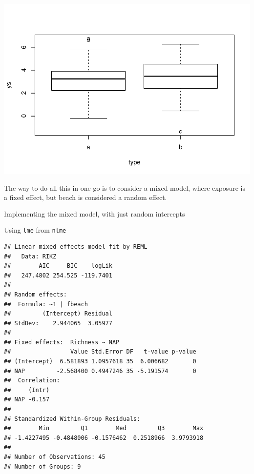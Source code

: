 \documentclass[
]{book}
\newenvironment{Shaded}{\begin{snugshade}}{\end{snugshade}}
\newcommand{\AttributeTok}[1]{\textcolor[rgb]{0.13,0.29,0.53}{#1}}
\newcommand{\DecValTok}[1]{\textcolor[rgb]{0.00,0.00,0.81}{#1}}
\newcommand{\FunctionTok}[1]{\textcolor[rgb]{0.13,0.29,0.53}{\textbf{#1}}}
\newcommand{\NormalTok}[1]{#1}
\newcommand{\OtherTok}[1]{\textcolor[rgb]{0.56,0.35,0.01}{#1}}
\newcommand{\SpecialCharTok}[1]{\textcolor[rgb]{0.81,0.36,0.00}{\textbf{#1}}}
\begin{document}
\includegraphics{ECOMODbook_files/figure-latex/unnamed-chunk-65-1.pdf}

The way to do all this in one go is to consider a mixed model, where exposure is a fixed effect, but beach is considered a random effect.

Implementing the mixed model, with just random intercepts

Using \texttt{lme} from \texttt{nlme}

\begin{Shaded}
\end{Shaded}

\begin{verbatim}
## Linear mixed-effects model fit by REML
##   Data: RIKZ 
##        AIC     BIC    logLik
##   247.4802 254.525 -119.7401
## 
## Random effects:
##  Formula: ~1 | fbeach
##         (Intercept) Residual
## StdDev:    2.944065  3.05977
## 
## Fixed effects:  Richness ~ NAP 
##                 Value Std.Error DF   t-value p-value
## (Intercept)  6.581893 1.0957618 35  6.006682       0
## NAP         -2.568400 0.4947246 35 -5.191574       0
##  Correlation: 
##     (Intr)
## NAP -0.157
## 
## Standardized Within-Group Residuals:
##        Min         Q1        Med         Q3        Max 
## -1.4227495 -0.4848006 -0.1576462  0.2518966  3.9793918 
## 
## Number of Observations: 45
## Number of Groups: 9
\end{verbatim}
\end{document}
